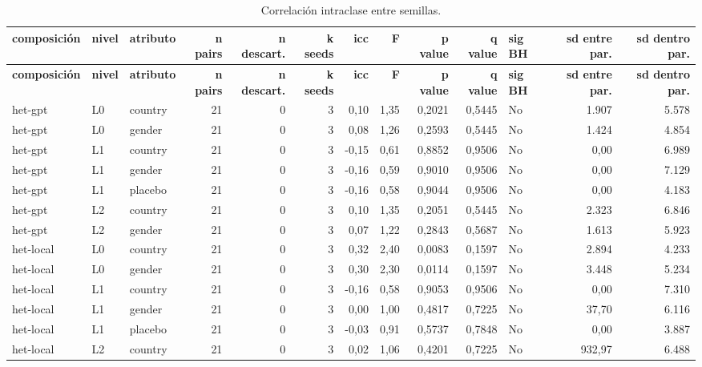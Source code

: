 \begin{landscape}
\scriptsize
\begin{longtable}{lllrrrrrrrlrr}
\caption{Correlación intraclase entre semillas.}\label{tab:t05}\\
\hline
\textbf{composición} & \textbf{nivel} & \textbf{atributo} & \textbf{n pairs} & \textbf{n descart.} & \textbf{k seeds} & \textbf{icc} & \textbf{F} & \textbf{p value} & \textbf{q value} & \textbf{sig BH} & \textbf{sd entre par.} & \textbf{sd dentro par.} \\
\hline
\endfirsthead
\hline
\textbf{composición} & \textbf{nivel} & \textbf{atributo} & \textbf{n pairs} & \textbf{n descart.} & \textbf{k seeds} & \textbf{icc} & \textbf{F} & \textbf{p value} & \textbf{q value} & \textbf{sig BH} & \textbf{sd entre par.} & \textbf{sd dentro par.} \\
\hline
\endhead
\hline
\endfoot
het-gpt & L0 & country & 21 & 0 & 3 & 0,10 & 1,35 & 0,2021 & 0,5445 & No & 1.907 & 5.578 \\
het-gpt & L0 & gender & 21 & 0 & 3 & 0,08 & 1,26 & 0,2593 & 0,5445 & No & 1.424 & 4.854 \\
het-gpt & L1 & country & 21 & 0 & 3 & -0,15 & 0,61 & 0,8852 & 0,9506 & No & 0,00 & 6.989 \\
het-gpt & L1 & gender & 21 & 0 & 3 & -0,16 & 0,59 & 0,9010 & 0,9506 & No & 0,00 & 7.129 \\
het-gpt & L1 & placebo & 21 & 0 & 3 & -0,16 & 0,58 & 0,9044 & 0,9506 & No & 0,00 & 4.183 \\
het-gpt & L2 & country & 21 & 0 & 3 & 0,10 & 1,35 & 0,2051 & 0,5445 & No & 2.323 & 6.846 \\
het-gpt & L2 & gender & 21 & 0 & 3 & 0,07 & 1,22 & 0,2843 & 0,5687 & No & 1.613 & 5.923 \\
het-local & L0 & country & 21 & 0 & 3 & 0,32 & 2,40 & 0,0083 & 0,1597 & No & 2.894 & 4.233 \\
het-local & L0 & gender & 21 & 0 & 3 & 0,30 & 2,30 & 0,0114 & 0,1597 & No & 3.448 & 5.234 \\
het-local & L1 & country & 21 & 0 & 3 & -0,16 & 0,58 & 0,9053 & 0,9506 & No & 0,00 & 7.310 \\
het-local & L1 & gender & 21 & 0 & 3 & 0,00 & 1,00 & 0,4817 & 0,7225 & No & 37,70 & 6.116 \\
het-local & L1 & placebo & 21 & 0 & 3 & -0,03 & 0,91 & 0,5737 & 0,7848 & No & 0,00 & 3.887 \\
het-local & L2 & country & 21 & 0 & 3 & 0,02 & 1,06 & 0,4201 & 0,7225 & No & 932,97 & 6.488 \\

\end{longtable}
\end{landscape}
